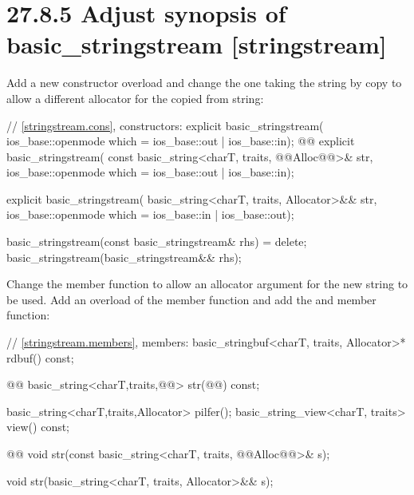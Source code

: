 \documentclass[ebook,11pt,article]{memoir}
\begin{document}
\section{27.8.5 Adjust synopsis of basic\_stringstream [stringstream]}
Add a new constructor overload and change the one taking the string by copy to allow a different allocator for the copied from string:
\begin{codeblock}
    // \ref{stringstream.cons}, constructors:
    explicit basic_stringstream(
      ios_base::openmode which = ios_base::out | ios_base::in);
    @@
    explicit basic_stringstream(
      const basic_string<charT, traits, @@Alloc@@>& str,
      ios_base::openmode which = ios_base::out | ios_base::in);
\end{codeblock}
\begin{addedblock}
\begin{codeblock}
    explicit basic_stringstream(
      basic_string<charT, traits, Allocator>&& str,
      ios_base::openmode which = ios_base::in | ios_base::out);
\end{codeblock}
\end{addedblock}
\begin{codeblock}
    basic_stringstream(const basic_stringstream& rhs) = delete;
    basic_stringstream(basic_stringstream&& rhs);
\end{codeblock}

Change the  member function to allow an allocator argument for the new string to be used.
Add an overload of the  member function and add the  and  member function:

\begin{codeblock}
    // \ref{stringstream.members}, members:
    basic_stringbuf<charT, traits, Allocator>* rdbuf() const;

    @@
    basic_string<charT,traits,@@> str(@@) const;
\end{codeblock}
\begin{addedblock}\begin{codeblock}
    basic_string<charT,traits,Allocator> pilfer();
    basic_string_view<charT, traits> view() const;
\end{codeblock}\end{addedblock}
\begin{codeblock}
    @@
    void str(const basic_string<charT, traits, @@Alloc@@>& s);
\end{codeblock}
\begin{addedblock}
\begin{codeblock}
    void str(basic_string<charT, traits, Allocator>&& s);
\end{codeblock}
\end{addedblock}
\end{document}

